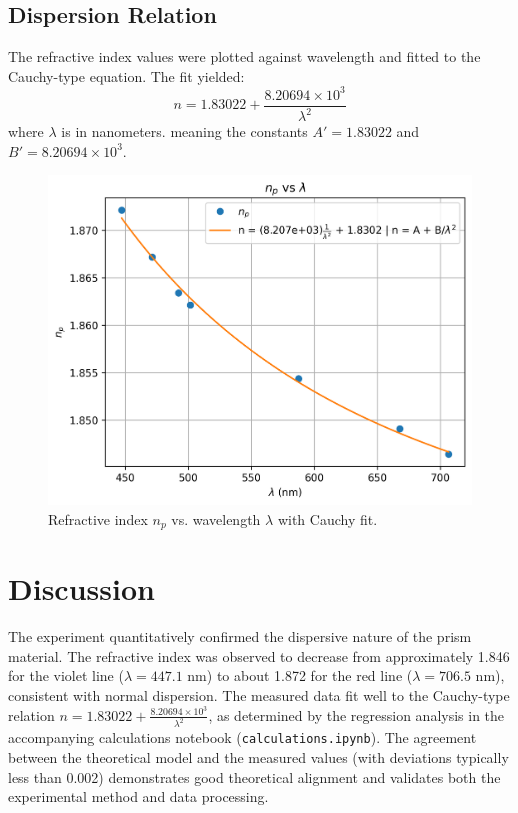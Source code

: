 \documentclass[journal]{IEEEtran}
\begin{document}
\subsection{Dispersion Relation}
The refractive index values were plotted against wavelength and fitted to the Cauchy-type equation. The fit yielded:
\begin{equation}
n = 1.83022 + \frac{8.20694 \times 10^3}{\lambda^2}
\end{equation}
where \( \lambda \) is in nanometers.
meaning the constants \( A' = 1.83022 \) and \( B' = 8.20694 \times 10^3 \).
\begin{figure}[H]
    \centering
    \includegraphics[width=0.8\linewidth]{../plots/npVSlambda.png}
    \caption{Refractive index $n_p$ vs. wavelength $\lambda$ with Cauchy fit.}
    \label{fig:np_vs_lambda}
\end{figure}
\section{Discussion}
The experiment quantitatively confirmed the dispersive nature of the prism material. The refractive index was observed to decrease from approximately 1.846 for the violet line (\( \lambda = 447.1 \) nm) to about 1.872 for the red line (\( \lambda = 706.5 \) nm), consistent with normal dispersion. The measured data fit well to the Cauchy-type relation \( n = 1.83022 + \frac{8.20694 \times 10^3}{\lambda^2} \), as determined by the regression analysis in the accompanying calculations notebook (\texttt{calculations.ipynb}). The agreement between the theoretical model and the measured values (with deviations typically less than 0.002) demonstrates good theoretical alignment and validates both the experimental method and data processing.
\end{document}
